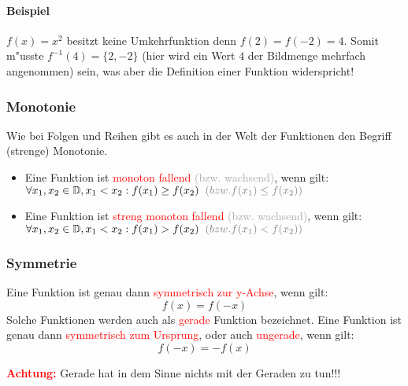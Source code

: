 \paragraph{Beispiel}
$f(x) = x^2$ besitzt keine Umkehrfunktion denn $f(2) = f(-2) = 4$. Somit m"usste $f^{-1}(4) = \{2, -2\}$ (hier wird ein Wert $4$ der Bildmenge mehrfach angenommen) sein, was aber die Definition einer Funktion widerspricht!

\subsubsection{Monotonie}
Wie bei Folgen und Reihen gibt es auch in der Welt der Funktionen den Begriff (strenge) Monotonie.\\
\begin{itemize}
\item Eine Funktion ist \textcolor{red}{monoton fallend} \textcolor{DarkGrey}{(bzw. wachsend)}, wenn gilt:\\
$\forall x_1, x_2 \in\mathbb{D}, x_1 < x_2: f(x_1)\geq f(x_2) \hspace{0.2 cm}\textcolor{DarkGrey}{(bzw. f(x_1)\leq f(x_2))}$
\item Eine Funktion ist \textcolor{red}{streng monoton fallend} \textcolor{DarkGrey}{(bzw. wachsend)}, wenn gilt:\\
$\forall x_1, x_2 \in\mathbb{D}, x_1 < x_2: f(x_1)>f(x_2) \hspace{0.2 cm}\textcolor{DarkGrey}{(bzw. f(x_1)<f(x_2))}$
\end{itemize}

\subsubsection{Symmetrie} \label{sec:symmetrie}
Eine Funktion ist genau dann \textcolor{red}{symmetrisch zur y-Achse}, wenn gilt:
\begin{equation*}
f(x)=f(-x)
\end{equation*}
Solche Funktionen werden auch als \textcolor{red}{gerade} Funktion bezeichnet. Eine Funktion ist genau dann \textcolor{red}{symmetrisch zum Ursprung}, oder auch \textcolor{red}{ungerade}, wenn gilt:
\begin{equation*}
f(-x)=-f(x)
\end{equation*}
\begin{center}
\textbf{\textcolor{red}{Achtung:}} Gerade hat in dem Sinne nichts mit der Geraden zu tun!!!
\end{center}

